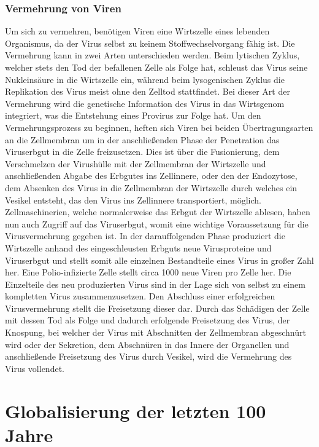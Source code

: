 \documentclass[12pt]{article}
\newcommand{\nocontentsline}[3]{}
\newcommand{\tocless}[2]{\bgroup\let\addcontentsline=\nocontentsline#1{#2}\egroup}
\begin{document}
\tocless \subsubsection{Vermehrung von Viren}
Um sich zu vermehren, benötigen Viren eine Wirtszelle eines lebenden Organismus, da der Virus selbst zu keinem Stoffwechselvorgang fähig ist. Die Vermehrung kann in zwei Arten unterschieden werden. Beim lytischen Zyklus, welcher stets den Tod der befallenen Zelle als Folge hat, schleust das Virus seine Nukleinsäure in die Wirtszelle ein, während beim lysogenischen Zyklus die Replikation des Virus meist ohne den Zelltod stattfindet. Bei dieser Art der Vermehrung wird die genetische Information des Virus in das Wirtsgenom integriert, was die Entstehung eines Provirus zur Folge hat. Um den Vermehrungsprozess zu beginnen, heften sich Viren bei beiden Übertragungsarten an die Zellmembran um in der anschließenden Phase der Penetration das Viruserbgut in die Zelle freizusetzen. Dies ist über die Fusionierung, dem Verschmelzen der Virushülle mit der Zellmembran der Wirtszelle und anschließenden Abgabe des Erbgutes ins Zellinnere, oder den der Endozytose, dem Absenken des Virus in die Zellmembran der Wirtszelle durch welches ein Vesikel entsteht, das den Virus ins Zellinnere transportiert, möglich. Zellmaschinerien, welche normalerweise das Erbgut der Wirtszelle ablesen, haben nun auch Zugriff auf das Viruserbgut, womit eine wichtige Voraussetzung für die Virusvermehrung gegeben ist. In der darauffolgenden Phase produziert die Wirtszelle anhand des eingeschleusten Erbguts neue Virusproteine und Viruserbgut und stellt somit alle einzelnen Bestandteile eines Virus in großer Zahl her. Eine Polio-infizierte Zelle stellt circa 1000 neue Viren pro Zelle her. Die Einzelteile des neu produzierten Virus sind in der Lage sich von selbst zu einem kompletten Virus zusammenzusetzen. Den Abschluss einer erfolgreichen Virusvermehrung stellt die Freisetzung dieser dar. Durch das Schädigen der Zelle mit dessen Tod als Folge und dadurch erfolgende Freisetzung des Virus, der Knospung, bei welcher der Virus mit Abschnitten der Zellmembran abgeschnürt wird oder der Sekretion, dem Abschnüren in das Innere der Organellen und anschließende Freisetzung des Virus durch Vesikel, wird die Vermehrung des Virus vollendet.

\section{Globalisierung der letzten 100 Jahre}\label{sec:Globalisierung}
\end{document}

